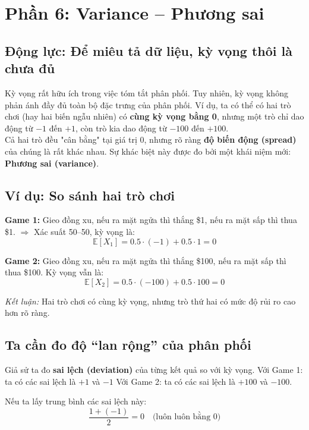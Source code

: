 \documentclass[11pt]{article}
\begin{document}
\section{Phần 6: Variance – Phương sai}
\subsection{Động lực: Để miêu tả dữ liệu, kỳ vọng thôi là chưa đủ}
Kỳ vọng rất hữu ích trong việc tóm tắt phân phối. Tuy nhiên, kỳ vọng không phản ánh đầy đủ toàn bộ đặc trưng của phân phối.  Ví dụ, ta có thể có hai trò chơi (hay hai biến ngẫu nhiên) có \textbf{cùng kỳ vọng bằng 0}, nhưng một trò chỉ dao động từ $-1$ đến $+1$, còn trò kia dao động từ $-100$ đến $+100$. \\

Cả hai trò đều "cân bằng" tại giá trị 0, nhưng rõ ràng \textbf{độ biến động (spread)} của chúng là rất khác nhau.   Sự khác biệt này được đo bởi một khái niệm mới: \textbf{Phương sai (variance)}.

\vspace{1em}

\subsection{Ví dụ: So sánh hai trò chơi}

\textbf{Game 1:} Gieo đồng xu, nếu ra mặt ngửa thì thắng \$1, nếu ra mặt sấp thì thua \$1.  
$\Rightarrow$ Xác suất 50–50, kỳ vọng là:
\[
\mathbb{E}[X_1] = 0.5 \cdot (-1) + 0.5 \cdot 1 = 0
\]

\textbf{Game 2:} Gieo đồng xu, nếu ra mặt ngửa thì thắng \$100, nếu ra mặt sấp thì thua \$100.  
Kỳ vọng vẫn là:
\[
\mathbb{E}[X_2] = 0.5 \cdot (-100) + 0.5 \cdot 100 = 0
\]

\textit{Kết luận:} Hai trò chơi có cùng kỳ vọng, nhưng trò thứ hai có mức độ rủi ro cao hơn rõ ràng.

\vspace{1em}

\subsection{Ta cần đo độ “lan rộng” của phân phối}

Giả sử ta đo \textbf{sai lệch (deviation)} của từng kết quả so với kỳ vọng.  
Với Game 1: ta có các sai lệch là $+1$ và $-1$  
Với Game 2: ta có các sai lệch là $+100$ và $-100$.

Nếu ta lấy trung bình các sai lệch này:
\[
\frac{1 + (-1)}{2} = 0 \quad \text{(luôn luôn bằng 0)}
\]
\end{document}
